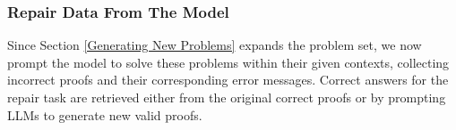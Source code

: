 \subsubsection{Repair Data From The Model}\label{Repair Data From The Model}







Since Section \ref{Generating New Problems} expands the problem set, we now prompt the model to solve these problems within their given contexts, collecting incorrect proofs and their corresponding error messages. Correct answers for the repair task are retrieved either from the original correct proofs or by prompting LLMs to generate new valid proofs.


